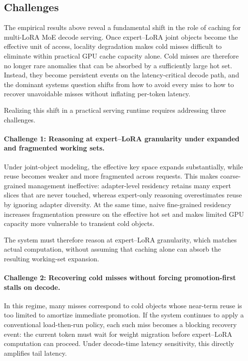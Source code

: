 \documentclass[sigplan,anonymous,review,nonacm]{acmart}
\begin{document}
\subsection{Challenges}
\label{subsec:challenges}

The empirical results above reveal a fundamental shift in the role of caching for multi-LoRA MoE decode serving. Once expert--LoRA joint objects become the effective unit of access, locality degradation makes cold misses difficult to eliminate within practical GPU cache capacity alone. Cold misses are therefore no longer rare anomalies that can be absorbed by a sufficiently large hot set. Instead, they become persistent events on the latency-critical decode path, and the dominant systems question shifts from how to avoid every miss to how to recover unavoidable misses without inflating per-token latency.

Realizing this shift in a practical serving runtime requires addressing three challenges.

\paragraph{Challenge 1: Reasoning at expert--LoRA granularity under expanded and fragmented working sets.}
\label{subsec:challenge-residency}

Under joint-object modeling, the effective key space expands substantially, while reuse becomes weaker and more fragmented across requests. This makes coarse-grained management ineffective: adapter-level residency retains many expert slices that are never touched, whereas expert-only reasoning overestimates reuse by ignoring adapter diversity. At the same time, naive fine-grained residency increases fragmentation pressure on the effective hot set and makes limited GPU capacity more vulnerable to transient cold objects.

The system must therefore reason at expert--LoRA granularity, which matches actual computation, without assuming that caching alone can absorb the resulting working-set expansion.

\paragraph{Challenge 2: Recovering cold misses without forcing promotion-first stalls on decode.}
\label{subsec:challenge-miss}

In this regime, many misses correspond to cold objects whose near-term reuse is too limited to amortize immediate promotion. If the system continues to apply a conventional load-then-run policy, each such miss becomes a blocking recovery event: the current token must wait for weight migration before expert--LoRA computation can proceed. Under decode-time latency sensitivity, this directly amplifies tail latency.
\end{document}
